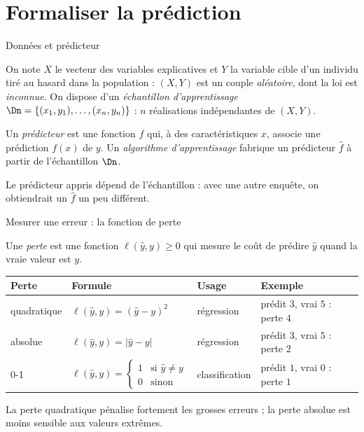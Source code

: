 \documentclass[aspectratio=169,11pt]{beamer}
\begin{document}
\section{Formaliser la prédiction}

\begin{frame}{Données et prédicteur}
  \begin{definition}[Données]
    On note $X$ le vecteur des variables explicatives et $Y$ la variable cible d'un individu tiré au hasard dans la population : $(X,Y)$ est un couple \emph{aléatoire}, dont la loi est \emph{inconnue}.
    On dispose d'un \emph{échantillon d'apprentissage} $\Dn=\{(x_1,y_1),\dots,(x_n,y_n)\}$ : $n$ réalisations indépendantes de $(X,Y)$.
  \end{definition}
  \begin{definition}[Prédicteur]
    Un \emph{prédicteur} est une fonction $f$ qui, à des caractéristiques $x$, associe une prédiction $f(x)$ de $y$.
    Un \emph{algorithme d'apprentissage} fabrique un prédicteur $\hat f$ à partir de l'échantillon $\Dn$.
  \end{definition}
  \begin{remarque}
    Le prédicteur appris dépend de l'échantillon : avec une autre enquête, on obtiendrait un $\hat f$ un peu différent.
  \end{remarque}
\end{frame}

\begin{frame}{Mesurer une erreur : la fonction de perte}
  \begin{definition}[Perte]
    Une \emph{perte} est une fonction $\ell(\hat y,y)\ge0$ qui mesure le coût de prédire $\hat y$ quand la vraie valeur est $y$.
  \end{definition}
  \vskip1mm
  \begin{center}
    \renewcommand{\arraystretch}{1.35}
    \begin{tabular}{llll}
      \toprule
      \textbf{Perte} & \textbf{Formule} & \textbf{Usage} & \textbf{Exemple} \\
      \midrule
      quadratique & $\ell(\hat y,y)=(\hat y-y)^2$ & régression & prédit $3$, vrai $5$ : perte $4$ \\
      absolue & $\ell(\hat y,y)=|\hat y-y|$ & régression & prédit $3$, vrai $5$ : perte $2$ \\
      0-1 & $\ell(\hat y,y)=\begin{cases}1&\text{si }\hat y\ne y\\0&\text{sinon}\end{cases}$ & classification & prédit $1$, vrai $0$ : perte $1$ \\
      \bottomrule
    \end{tabular}
  \end{center}
  \vskip1mm
  {\small\color{cnfGris}La perte quadratique pénalise fortement les grosses erreurs ; la perte absolue est moins sensible aux valeurs extrêmes.}
\end{frame}
\end{document}
